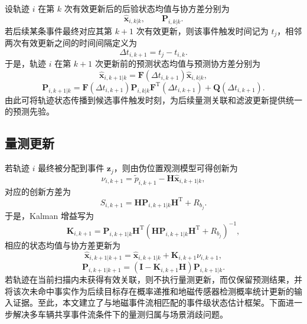 \documentclass{xdupgthesis}
\begin{document}
设轨迹 $i$ 在第 $k$ 次有效更新后的后验状态均值与协方差分别为
\begin{equation}
	\hat{\mathbf x}_{i,k|k},
	\qquad
	\mathbf P_{i,k|k}.
	\label{eq:ch3_post_state}
\end{equation}
若后续某条事件最终对应其第 $k+1$ 次有效更新，则该事件触发时间记为 $t_j$，相邻两次有效更新之间的时间间隔定义为
\begin{equation}
	\Delta t_{i,k+1}=t_j-t_{i,k}.
	\label{eq:ch3_dt_update}
\end{equation}
于是，轨迹 $i$ 在第 $k+1$ 次更新前的预测状态均值与预测协方差分别为
\begin{equation}
	\hat{\mathbf x}_{i,k+1|k}
	=
	\mathbf F\left(\Delta t_{i,k+1}\right)\hat{\mathbf x}_{i,k|k},
	\label{eq:ch3_predict_state}
\end{equation}
\begin{equation}
	\mathbf P_{i,k+1|k}
	=
	\mathbf F\left(\Delta t_{i,k+1}\right)
	\mathbf P_{i,k|k}
	\mathbf F^{\mathrm T}\left(\Delta t_{i,k+1}\right)
	+
	\mathbf Q\left(\Delta t_{i,k+1}\right).
	\label{eq:ch3_predict_cov}
\end{equation}
由此可将轨迹状态传播到候选事件触发时刻，为后续量测关联和滤波更新提供统一的预测先验。

\subsection{量测更新}

若轨迹 $i$ 最终被分配到事件 $\mathbf z_j$，则由伪位置观测模型可得创新为
\begin{equation}
	\nu_{i,k+1}=\tilde p_{i,k+1}-\mathbf H\hat{\mathbf x}_{i,k+1|k},
	\label{eq:ch3_innovation_event}
\end{equation}
对应的创新方差为
\begin{equation}
	S_{i,k+1}=\mathbf H\mathbf P_{i,k+1|k}\mathbf H^{\mathrm T}+R_{b_j}.
	\label{eq:ch3_S_event}
\end{equation}
于是，Kalman 增益写为
\begin{equation}
	\mathbf K_{i,k+1}
	=
	\mathbf P_{i,k+1|k}\mathbf H^{\mathrm T}
	\left(
	\mathbf H\mathbf P_{i,k+1|k}\mathbf H^{\mathrm T}+R_{b_j}
	\right)^{-1},
	\label{eq:ch3_K_event}
\end{equation}
相应的状态均值与协方差更新为
\begin{equation}
	\hat{\mathbf x}_{i,k+1|k+1}
	=
	\hat{\mathbf x}_{i,k+1|k}
	+
	\mathbf K_{i,k+1}\nu_{i,k+1},
	\label{eq:ch3_update_state_event}
\end{equation}
\begin{equation}
	\mathbf P_{i,k+1|k+1}
	=
	\left(\mathbf I-\mathbf K_{i,k+1}\mathbf H\right)\mathbf P_{i,k+1|k}.
	\label{eq:ch3_update_cov_event}
\end{equation}
若轨迹在当前扫描内未获得有效关联，则不执行量测更新，而仅保留预测结果，并将该次未命中事实作为后续目标存在概率递推和地磁传感器检测概率统计更新的输入证据。至此，本文建立了与地磁事件流相匹配的事件级状态估计框架。下面进一步解决多车辆共享事件流条件下的量测归属与场景消歧问题。
\end{document}
